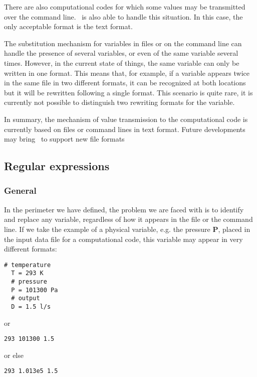 There are also computational codes for which some values may be transmitted over the command line. \OT\ is also able to handle this situation. In this case, the only acceptable format is the text format.

The substitution mechanism for variables in files or on the command line can handle the presence of several variables, or even of the same variable several times. However, in the current state of things, the same variable can only be written in one format. This means that, for example, if a variable appears twice in the same file in two different formats, it can be recognized at both locations but it will be rewritten following a single format. This scenario is quite rare, it is currently not possible to distinguish two rewriting formats for the variable.

In summary, the mechanism of value transmission to the computational code is currently based on files or command lines in text format. Future developments may bring \OT\ to support new file formats%

\subsection{Regular expressions}

\subsubsection{General}

In the perimeter we have defined, the problem we are faced with is to identify and replace any variable, regardless of how it appears in the file or the command line. If we take the example of a physical variable, e.g. the pressure {\bf P}, placed in the input data file for a computational code, this variable may appear in very different formats:
\lstset{language=C++, basicstyle=\normalsize}
\begin{lstlisting}[frame=TBRL]
  # temperature
  T = 293 K
  # pressure
  P = 101300 Pa
  # output
  D = 1.5 l/s
\end{lstlisting}

or
\lstset{language=C++, basicstyle=\normalsize}
\begin{lstlisting}[frame=TBRL]
  293 101300 1.5
\end{lstlisting}

or else
\lstset{language=C++, basicstyle=\normalsize}
\begin{lstlisting}[frame=TBRL]
  293 1.013e5 1.5
\end{lstlisting}

